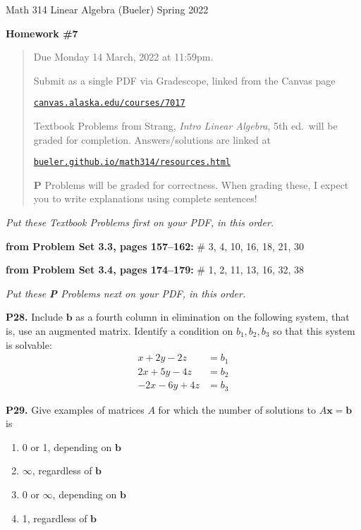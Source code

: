 \documentclass[12pt]{amsart}
\newcommand{\bb}{\bm{b}}
\newcommand{\bx}{\bm{x}}
\newcommand{\prob}[1]{\bigskip\noindent\textbf{#1.}\quad }
\newcommand{\probset}[2]{\bigskip\noindent\textbf{from Problem Set #1, pages #2:}\quad }
\begin{document}
\scriptsize \noindent Math 314 Linear Algebra (Bueler) \hfill Spring 2022
\normalsize\medskip

\Large
\centerline{\textbf{Homework \#7}}

\normalsize
\bigskip
\begin{quote}
Due Monday 14 March, 2022 at 11:59pm.

\medskip
\noindent Submit as a single PDF via Gradescope, linked from the Canvas page

\href{https://canvas.alaska.edu/courses/7017}{\texttt{canvas.alaska.edu/courses/7017}}

\noindent Textbook Problems from Strang, \emph{Intro Linear Algebra}, 5th ed.~will be graded for completion.  Answers/solutions are linked at

\href{https://bueler.github.io/math314/resources.html}{\texttt{bueler.github.io/math314/resources.html}}

\noindent \textbf{P} Problems will be graded for correctness.  When grading these, I expect you to write explanations using complete sentences!
\end{quote}
\medskip

\thispagestyle{empty}

\noindent \hrulefill

\noindent \emph{Put these Textbook Problems first on your PDF, in this order.}

\probset{3.3}{157--162} \# 3, 4, 10, 16, 18, 21, 30

\probset{3.4}{174--179} \# 1, 2, 11, 13, 16, 32, 38


\bigskip
\noindent \hrulefill

\noindent \emph{Put these \textbf{P} Problems next on your PDF, in this order.}

\prob{P28}  Include $\bb$ as a fourth column in elimination on the following system, that is, use an augmented matrix.  Identify a condition on $b_1,b_2,b_3$ so that this system is solvable:
\begin{align*}
x + 2 y - 2 z &= b_1 \\
2 x + 5 y - 4 z &= b_2 \\
-2 x - 6 y + 4 z &= b_3
\end{align*}


\prob{P29}  Give examples of matrices $A$ for which the number of solutions to $A \bx = \bb$ is

\renewcommand{\labelenumi}{\textbf{(\alph{enumi})}}
\begin{enumerate}
\item 0 or 1, depending on $\bb$
\item $\infty$, regardless of $\bb$
\item 0 or $\infty$, depending on $\bb$
\item 1, regardless of $\bb$
\end{enumerate}
\end{document}
